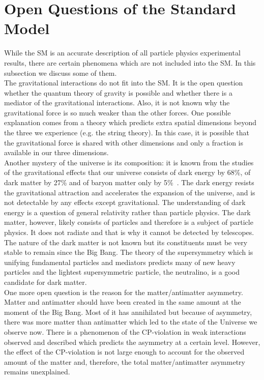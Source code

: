 \section{Open Questions of the Standard Model}


While the SM is an accurate description of all particle physics experimental results, there are certain phenomena which are not included into the SM. In this subsection we discuss some of them.\\

The gravitational interactions do not fit into the SM. It is the open question whether the quantum theory of gravity is possible and whether there is a mediator of the gravitational interactions. Also, it is not known why the gravitational force is so much weaker than the other forces. One possible explanation comes from a theory which predicts extra spatial dimensions beyond the three we experience (e.g. the string theory). In this case, it is possible that the gravitational force is shared with other dimensions and only a fraction is available in our three dimensions.\\

Another mystery of the universe is its composition: it is known from the studies of the gravitational effects that our universe consists of dark energy by 68\%, of dark matter by 27\% and of baryon matter only by 5\%~\cite{ref_NASA}. The dark energy resists the gravitational attraction and accelerates the expansion of the universe, and is not detectable by any effects except gravitational. The understanding of dark energy is a question of general relativity rather than particle physics. The dark matter, however, likely consists of particles and therefore is a subject of particle physics. It does not radiate and that is why it cannot be detected by telescopes. The nature of the dark matter is not known but its constituents must be very stable to remain since the Big Bang. The theory of the supersymmetry which is unifying fundamental particles and mediators predicts many of new heavy particles and the lightest supersymmetric particle, the neutralino, is a good candidate for dark matter.\\

One more open question is the reason for the matter/antimatter asymmetry. Matter and antimatter should have been created in the same amount at the moment of the Big Bang. Most of it has annihilated but because of asymmetry, there was more matter than antimatter which led to the state of the Universe we observe now. There is a phenomenon of the CP-violation in weak interactions observed and described which predicts the asymmetry at a certain level. However, the effect of the CP-violation is not large enough to account for the observed amount of the matter and, therefore, the total matter/antimatter asymmetry remains unexplained. \\


